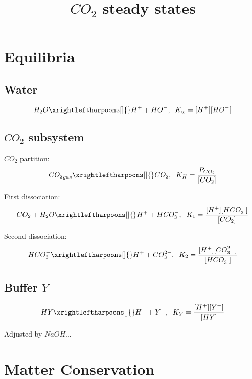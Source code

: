 \documentclass[aps,12pt]{revtex4}
\begin{document}
\title{$CO_2$ steady states}
\maketitle

\section{Equilibria}

\subsection{Water}
\begin{equation}
\label{water}
  H_2O \xrightleftharpoons[]{} H^+ + HO^-, \;\; K_w = [H^+][HO^-]
\end{equation}

\subsection{$CO_2$ subsystem}

$CO_2$ partition:
\begin{equation}
\label{co2_part}
{CO_2}_{gas} \xrightleftharpoons[]{} CO_2, \;\; K_H = \dfrac{P_{CO_2}}{[CO_2]}
\end{equation}

First dissociation:
\begin{equation}
\label{eq1}
CO_2 + H_2O\xrightleftharpoons[]{}  H^+ + HCO_3^-,\;\; K_1 = \dfrac{[H^+][HCO_3^-]}{[CO_2]}
\end{equation}

Second dissociation:
\begin{equation}
\label{eq1}
 HCO_3^- \xrightleftharpoons[]{} H^+ + CO_3^{2-},\;\; K_2 = \dfrac{[H^+][CO_3^{2-}]}{[HCO_3^-]}
\end{equation}

\subsection{Buffer $Y$}

\begin{equation}
\label{buffer}
HY \xrightleftharpoons[]{} H^+ + Y^-, \;\; K_Y = \dfrac{[H^+][Y^-]}{[HY]}
\end{equation}

Adjusted by $NaOH$...


\section{Matter Conservation}
\end{document}
